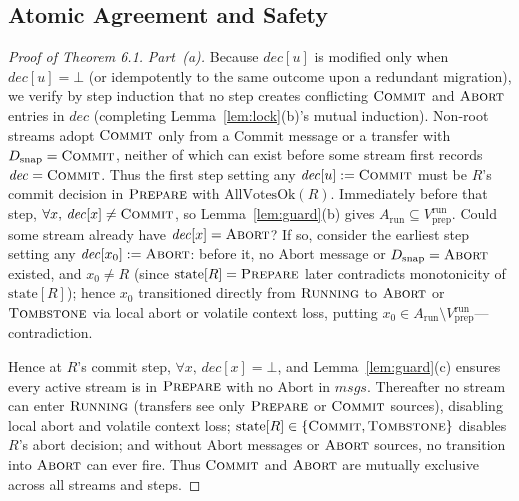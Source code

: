 \documentclass[sigconf,nonacm]{acmart}
\newcommand{\stRun}{\textsc{Running}}
\newcommand{\stPrep}{\textsc{Prepare}}
\newcommand{\stCom}{\textsc{Commit}}
\newcommand{\stAbt}{\textsc{Abort}}
\newcommand{\stTomb}{\textsc{Tombstone}}
\newcommand{\dec}{\mathit{dec}}
\begin{document}
\subsection{Atomic Agreement and Safety}
\label{sec:safety}
\begin{proof}[Proof of Theorem 6.1]
\emph{Part~(a).} Because \(\dec[u]\) is modified only when \(\dec[u] =
\bot\) (or idempotently to the same outcome upon a redundant migration), we
verify by step induction that no step creates conflicting \(\stCom\) and
\(\stAbt\) entries in \(\dec\) (completing Lemma~\ref{lem:lock}(b)'s mutual
induction). Non-root streams adopt \(\stCom\) only from a \(\mathrm{Commit}\)
message or a transfer with \(D_{\mathrm{snap}} = \stCom\), neither of which
can exist before some stream first records \(\dec = \stCom\). Thus the first
step setting any \(\dec[u] := \stCom\) must be \(R\)'s commit decision in
\(\stPrep\) with \(\mathrm{AllVotesOk}(R)\). Immediately before that step,
\(\forall x,\, \dec[x] \neq \stCom\), so Lemma~\ref{lem:guard}(b) gives
\(A_{\mathrm{run}} \subseteq V_{\mathrm{prep}}^{\mathrm{run}}\). Could some
stream already have \(\dec[x] = \stAbt\)? If so, consider the earliest step
setting any \(\dec[x_0] := \stAbt\): before it, no \(\mathrm{Abort}\) message
or \(D_{\mathrm{snap}} = \stAbt\) existed, and \(x_0 \neq R\) (since
\(\mathrm{state}[R] = \stPrep\) later contradicts monotonicity of
\(\mathrm{state}[R]\)); hence \(x_0\) transitioned directly from \(\stRun\)
to \(\stAbt\) or \(\stTomb\) via local abort or volatile context loss,
putting \(x_0 \in A_{\mathrm{run}} \setminus
V_{\mathrm{prep}}^{\mathrm{run}}\)---contradiction.

Hence at \(R\)'s commit step, \(\forall x,\, \dec[x] = \bot\), and
Lemma~\ref{lem:guard}(c) ensures every active stream is in \(\stPrep\) with
no \(\mathrm{Abort}\) in \(\mathit{msgs}\). Thereafter no stream can enter
\(\stRun\) (transfers see only \(\stPrep\) or \(\stCom\) sources), disabling
local abort and volatile context loss; \(\mathrm{state}[R] \in
\{\stCom,\allowbreak \stTomb\}\) disables \(R\)'s abort decision; and without
\(\mathrm{Abort}\) messages or \(\stAbt\) sources, no transition into
\(\stAbt\) can ever fire. Thus \(\stCom\) and \(\stAbt\) are mutually
exclusive across all streams and steps.


\end{proof}
\end{document}
